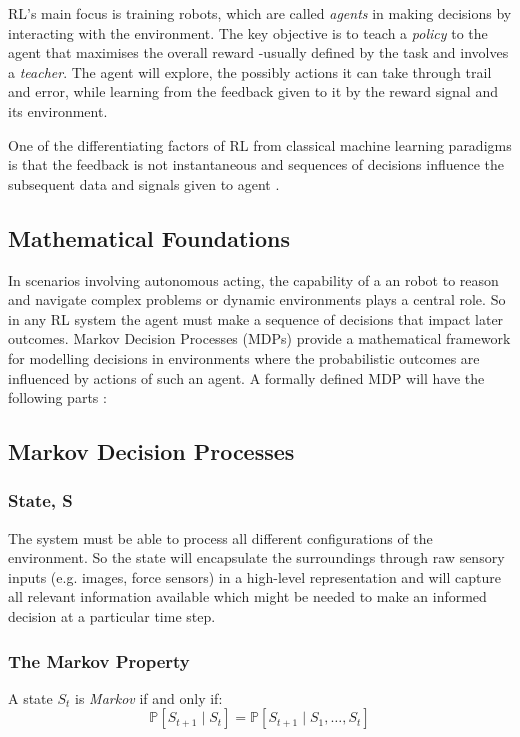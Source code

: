   RL's main focus is training robots, which are called \emph{agents} in making decisions by interacting with the environment. The key objective is to teach a \emph{policy} to the agent that maximises the overall reward -usually defined by the task and involves a \emph{teacher}. The agent will explore, the possibly actions it can take through trail and error, while learning from the feedback given to it by the reward signal and its environment.

  One of the differentiating factors of RL from classical machine learning paradigms is that the feedback is not instantaneous and sequences of decisions influence the subsequent data and signals given to agent \cite{silver2015}.

  \subsection{Mathematical Foundations}

  In scenarios involving autonomous acting, the capability of a an robot to reason and navigate complex problems or dynamic environments plays a central role. So in any RL system the agent must make a sequence of decisions that impact later outcomes. Markov Decision Processes (MDPs) provide a mathematical framework for modelling decisions in environments where the probabilistic outcomes are influenced by actions of such an agent. A formally defined MDP will have the following parts \cite{silver2015}:

\subsection{Markov Decision Processes}
  \subsubsection{State, S}
    The system must be able to process all different configurations of the environment. So the state will encapsulate the surroundings through raw sensory inputs (e.g. images, force sensors) in a high-level representation and will capture all relevant information available \cite{Sutton1998} which might be needed to make an informed decision at a particular time step.

  \subsubsection{The Markov Property}
    A state $S_t$ is \emph{Markov} if and only if:
    \[
      \mathbb{P} \left[S_{t+1} \mid S_t\right] = \mathbb{P}\left[ S_{t+1} \mid S_1, \ldots, S_t\right]
    \]

